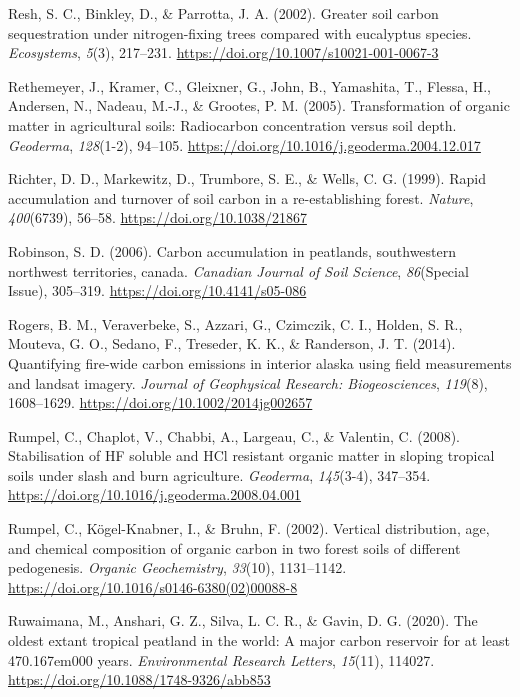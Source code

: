 \documentclass[]{article}
\begin{document}
\leavevmode\hypertarget{ref-Resh_2002}{}%
Resh, S. C., Binkley, D., \& Parrotta, J. A. (2002). Greater soil carbon
sequestration under nitrogen-fixing trees compared with eucalyptus
species. \emph{Ecosystems}, \emph{5}(3), 217--231.
\url{https://doi.org/10.1007/s10021-001-0067-3}

\leavevmode\hypertarget{ref-Rethemeyer_2005}{}%
Rethemeyer, J., Kramer, C., Gleixner, G., John, B., Yamashita, T.,
Flessa, H., Andersen, N., Nadeau, M.-J., \& Grootes, P. M. (2005).
Transformation of organic matter in agricultural soils: Radiocarbon
concentration versus soil depth. \emph{Geoderma}, \emph{128}(1-2),
94--105. \url{https://doi.org/10.1016/j.geoderma.2004.12.017}

\leavevmode\hypertarget{ref-Richter_1999}{}%
Richter, D. D., Markewitz, D., Trumbore, S. E., \& Wells, C. G. (1999).
Rapid accumulation and turnover of soil carbon in a re-establishing
forest. \emph{Nature}, \emph{400}(6739), 56--58.
\url{https://doi.org/10.1038/21867}

\leavevmode\hypertarget{ref-Robinson_2006}{}%
Robinson, S. D. (2006). Carbon accumulation in peatlands, southwestern
northwest territories, canada. \emph{Canadian Journal of Soil Science},
\emph{86}(Special Issue), 305--319.
\url{https://doi.org/10.4141/s05-086}

\leavevmode\hypertarget{ref-Rogers_2014}{}%
Rogers, B. M., Veraverbeke, S., Azzari, G., Czimczik, C. I., Holden, S.
R., Mouteva, G. O., Sedano, F., Treseder, K. K., \& Randerson, J. T.
(2014). Quantifying fire-wide carbon emissions in interior alaska using
field measurements and landsat imagery. \emph{Journal of Geophysical
Research: Biogeosciences}, \emph{119}(8), 1608--1629.
\url{https://doi.org/10.1002/2014jg002657}

\leavevmode\hypertarget{ref-Rumpel_2008}{}%
Rumpel, C., Chaplot, V., Chabbi, A., Largeau, C., \& Valentin, C.
(2008). Stabilisation of HF soluble and HCl resistant organic matter in
sloping tropical soils under slash and burn agriculture.
\emph{Geoderma}, \emph{145}(3-4), 347--354.
\url{https://doi.org/10.1016/j.geoderma.2008.04.001}

\leavevmode\hypertarget{ref-Rumpel_2002}{}%
Rumpel, C., Kögel-Knabner, I., \& Bruhn, F. (2002). Vertical
distribution, age, and chemical composition of organic carbon in two
forest soils of different pedogenesis. \emph{Organic Geochemistry},
\emph{33}(10), 1131--1142.
\url{https://doi.org/10.1016/s0146-6380(02)00088-8}

\leavevmode\hypertarget{ref-Ruwaimana_2020}{}%
Ruwaimana, M., Anshari, G. Z., Silva, L. C. R., \& Gavin, D. G. (2020).
The oldest extant tropical peatland in the world: A major carbon
reservoir for at least 470.167em000 years. \emph{Environmental Research
Letters}, \emph{15}(11), 114027.
\url{https://doi.org/10.1088/1748-9326/abb853}
\end{document}
